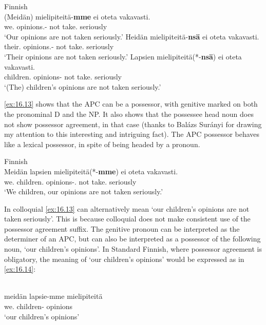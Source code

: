 \documentclass[output=paper]{langsci/langscibook}
\begin{document}
\ea Finnish\\\label{ex:16.12}
	\ea
		\gll (Meidän) mielipiteitä-\textbf{mme} ei   oteta   vakavasti.\\
        \hphantom{(}we.\Gen{} opinions.\Part{}-\Fpl{} not take.\Pass{} seriously\\
		\glt    `Our opinions are not taken seriously.'
	\ex
		\gll Heidän      mielipiteitä-\textbf{nsä} ei oteta  vakavasti.\\
			their.\Gen{} opinions.\Part{}-\Third{} not take.\Pass{} seriously\\
		\glt    `Their opinions are not taken seriously.'
	\ex
		\gll Lapsien mielipiteitä(*-\textbf{nsä})  ei  oteta           vakavasti.\\
			children.\Gen{} opinions-\Third{} not take.\Pass{} seriously\\
		\glt    `(The) children’s opinions are not taken seriously.'
	\z
\z

\eqref{ex:16.13} shows that the \gls{APC} can be a possessor, with genitive marked on
both the pronominal D and the NP. It also shows that the possessee head noun
does not show possessor agreement, in that case (thanks to Balázs Surányi for
drawing my attention to this interesting and intriguing fact). The
\gls{APC} possessor behaves like a lexical
possessor, in spite of being headed by a pronoun.

\ea Finnish\label{ex:16.13}\\
	\gll Meidän  lapsien   mielipiteitä(*-\textbf{mme}) ei  oteta         vakavasti.\\
		we.\Gen{} children.\Gen{} opinions-\Part.\Fpl{} not take.\Pass{} seriously\\
	\glt    `We children, our opinions are not taken seriously.'
\z

In colloquial  \eqref{ex:16.13} can alternatively mean ‘our children’s opinions are
not taken seriously’. This is because colloquial  does not make
consistent use of the possessor agreement suffix. The genitive pronoun can be
interpreted as the determiner of an \gls{APC}, but can also be interpreted as a
possessor of the following noun, ‘our children’s opinions’. In Standard
Finnish, where possessor agreement is obligatory, the meaning of ‘our
children’s opinions’ would be expressed as in \eqref{ex:16.14}:

\ea
    \label{ex:16.14} \\
    \gll meidän   lapsie-mme mielipiteitä \\
        we.\Gen{} children-\Fpl{} opinions\\
    \glt    `our children’s opinions'
\z
\end{document}
